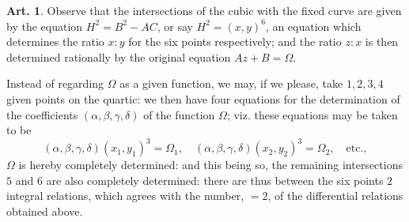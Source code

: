 \documentclass[11pt,a4paper]{article}
\theoremstyle{definition}
\newtheorem{art}{Art.}[section]
\begin{document}
\begin{art}
Observe that the intersections of the cubic with the fixed curve are given by the equation $H^2 = B^2 - AC$, or say $H^2 = (x,y)^6$, an equation which determines the ratio $x:y$ for the six points respectively; and the ratio $z:x$ is then determined rationally by the original equation $Az + B = \Omega$.

Instead of regarding $\Omega$ as a given function, we may, if we please, take $1,2,3,4$ given points on the quartic: we then have four equations for the determination of the coefficients $(\alpha,\beta,\gamma,\delta)$ of the function $\Omega$; viz. these equations may be taken to be
\[
(\alpha,\beta,\gamma,\delta)(x_1,y_1)^3 = \Omega_1, \quad (\alpha,\beta,\gamma,\delta)(x_2,y_2)^3 = \Omega_2, \quad \text{etc.},
\]
$\Omega$ is hereby completely determined: and this being so, the remaining intersections $5$ and $6$ are also completely determined: there are thus between the six points 2 integral relations, which agrees with the number, $=2$, of the differential relations obtained above.
\end{art}
\end{document}
